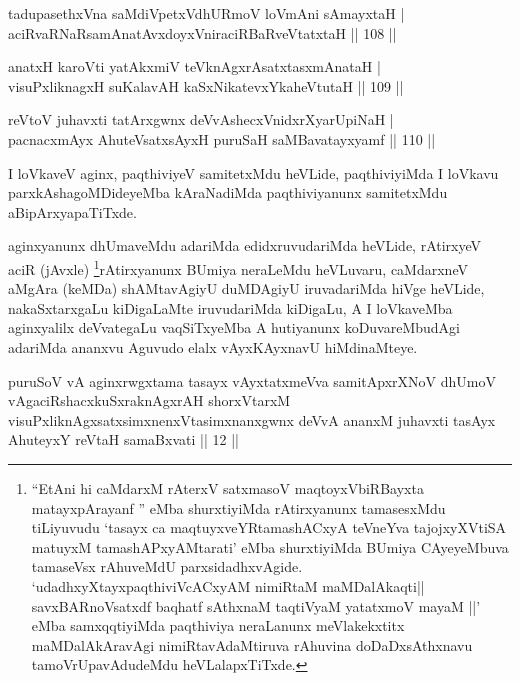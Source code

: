 \begin{shl}
tadupasethxVna saMdiVpetxVdhURmoV loVmAni sAmayxtaH | \\
aciRvaRNaRsamAnatAvxdoyxVniraciRBaRveVtatxtaH \hfill|| 108 || 
\end{shl}

\begin{shl}
anatxH karoVti yatAkxmiV teV\s knAgxrAsatxtasxmAnataH | \\
visuPxliknagxH suKalavAH kaSxNikatevxYkaheVtutaH \hfill|| 109 || 
\end{shl}

\begin{shl}
reVtoV juhavxti tatArxgwnx deVvAshecxVnidxrXyarUpiNaH | \\
pacnacxmAyx AhuteVsatxsAyxH puruSaH saMBavatayxyamf \hfill|| 110 || 
\end{shl}

\begin{artha}
I loVkaveV aginx, paqthiviyeV samitetxMdu heVLide, paqthiviyiMda I
loVkavu parxkAshagoMDideyeMba kAraNadiMda paqthiviyanunx samitetxMdu
aBipArxyapaTiTxde.
\end{artha}

\begin{artha}
aginxyanunx dhUmaveMdu adariMda edidxruvudariMda heVLide, rAtirxyeV
aciR (jAvxle) \footnote{``EtAni hi caMdarxM rAterxV satxmasoV maqtoyxVbiRBayxta matayxpArayanf '' eMba shurxtiyiMda rAtirxyanunx
  tamasesxMdu tiLiyuvudu `tasayx ca maqtuyxveYRtamashACxyA teVneYva tajojxyXVtiSA matuyxM tamashAPxyAMtarati' eMba shurxtiyiMda BUmiya CAyeyeMbuva
tamaseVsx rAhuveMdU parxsidadhxvAgide. \\`udadhxyXtayxpaqthiviVcACxyAM nimiRtaM maMDalAkaqti||\\
savxBARnoVsatxdf baqhatf sAthxnaM taqtiVyaM yatatxmoV mayaM ||' \\eMba samxqqtiyiMda
paqthiviya neraLanunx meVlakekxtitx maMDalAkAravAgi nimiRtavAdaMtiruva
rAhuvina doDaDxsAthxnavu tamoVrUpavAdudeMdu heVLalapxTiTxde.}rAtirxyanunx BUmiya neraLeMdu heVLuvaru,
caMdarxneV aMgAra (keMDa) shAMtavAgiyU duMDAgiyU iruvadariMda hiVge
heVLide, nakaSxtarxgaLu kiDigaLaMte iruvudariMda kiDigaLu, A I
loVkaveMba aginxyalilx deVvategaLu vaqSiTxyeMba A hutiyanunx
koDuvareMbudAgi adariMda ananxvu Aguvudo elalx vAyxKAyxnavU
hiMdinaMteye.
\end{artha}


\begin{shl}
puruSoV vA aginxrwgxtama tasayx vAyxtatxmeVva samitApxrXNoV dhUmoV vAgaciRshacxkuSxraknAgxrAH shorxVtarxM visuPxliknAgxsatxsimxnenxVtasimxnanxgwnx deVvA ananxM juhavxti tasAyx AhuteyxY reVtaH samaBxvati || 12 ||
\end{shl}

